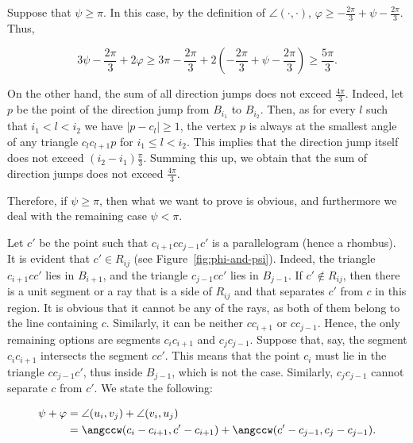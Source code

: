 \begin{enumerate}[label={\bf Case \arabic*: }, wide, labelwidth=!, labelindent=0pt]
Suppose that $\psi\geq\pi$. In this case, by the definition of $\angle(\cdot, \cdot)$, $\varphi\geq-\frac{2\pi}{3} + \psi - \frac{2\pi}{3}$. Thus,

$$3\psi - \frac{2\pi}{3} + 2\varphi\geq 3\pi - \frac{2\pi}{3} + 2\left(-\frac{2\pi}{3} + \psi - \frac{2\pi}{3}\right)\geq \frac{5\pi}{3}.$$

On the other hand, the sum of all direction jumps does not exceed $\frac{4\pi}{3}$. Indeed,
let $p$ be the point of the direction jump from $B_{i_1}$ to $B_{i_2}$. Then, as for every $l$ such that $i_1 < l < i_2$ we have $|p - c_l|\geq 1$, the vertex $p$ is always at the smallest angle of any triangle $c_lc_{l+1}p$ for $i_1\leq l < i_2$. This implies that the direction jump itself does not exceed $(i_2 - i_1)\frac{\pi}{3}$. Summing this up, we obtain that the sum of direction jumps does not exceed $\frac{4\pi}{3}$.

Therefore, if $\psi\geq\pi$, then what we want to prove is obvious, and furthermore we deal with the remaining case $\psi < \pi$.

Let $c'$ be the point such that $c_{i+1}cc_{j-1}c'$ is a parallelogram (hence a rhombus). It is evident that $c'\in R_{ij}$ (see Figure~\ref{fig:phi-and-psi}). Indeed, the triangle $c_{i+1}cc'$ lies in $B_{i+1}$, and the triangle $c_{j-1}cc'$ lies in $B_{j-1}$. If $c'\notin R_{ij}$, then there is a unit segment or a ray that is a side of $R_{ij}$ and that separates $c'$ from $c$ in this region. %
It is obvious that it cannot be any of the rays, as both of them belong to the line containing $c$. Similarly, it can be neither $cc_{i+1}$ or $cc_{j-1}$. Hence, the only remaining options are segments $c_ic_{i+1}$ and $c_jc_{j-1}$. Suppose that, say, the segment $c_ic_{i+1}$ intersects the segment $cc'$. This means that the point $c_i$ must lie in the triangle $cc_{j-1}c'$, thus inside $B_{j-1}$, which is not the case. Similarly, $c_jc_{j-1}$ cannot separate $c$ from $c'$.
We state the following:

\begin{observation}
\begin{align*}
\psi + \varphi & = \angle(u_i, v_j) + \angle(v_i, u_j) \\
& = \angccw(c_i - c_{i+1}, c' - c_{i+1}) + \angccw(c' - c_{j-1}, c_j - c_{j-1}).    
\end{align*}


\end{observation}
\end{enumerate}
